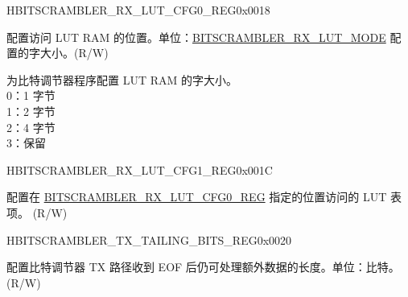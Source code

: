 \begin{register}{H}{BITSCRAMBLER\_RX\_LUT\_CFG0\_REG}{0x0018}\label{regdesc:BITSCRAMBLERRXLUTCFG0REG}
%
%
%
\regnewline%
\begin{regdesc}\begin{reglist}
\label{fielddesc:BITSCRAMBLERRXLUTIDX}\item [BITSCRAMBLER\_RX\_LUT\_IDX] 配置访问 LUT RAM 的位置。单位：\hyperref[fielddesc:BITSCRAMBLERRXLUTMODE]{BITSCRAMBLER\_RX\_LUT\_MODE} 配置的字大小。(R/W)
\label{fielddesc:BITSCRAMBLERRXLUTMODE}\item [BITSCRAMBLER\_RX\_LUT\_MODE] 为比特调节器程序配置 LUT RAM 的字大小。 \\
0：1 字节\\
1：2 字节\\
2：4 字节\\
3：保留 \\
\end{reglist}\end{regdesc}
\end{register}


\begin{register}{H}{BITSCRAMBLER\_RX\_LUT\_CFG1\_REG}{0x001C}\label{regdesc:BITSCRAMBLERRXLUTCFG1REG}
%
\regnewline%
\begin{regdesc}\begin{reglist}
\label{fielddesc:BITSCRAMBLERRXLUT}\item [BITSCRAMBLER\_RX\_LUT] 配置在  \hyperref[regdesc:BITSCRAMBLERRXLUTCFG0REG]{BITSCRAMBLER\_RX\_LUT\_CFG0\_REG} 指定的位置访问的 LUT 表项。 (R/W)
\end{reglist}\end{regdesc}
\end{register}


\begin{register}{H}{BITSCRAMBLER\_TX\_TAILING\_BITS\_REG}{0x0020}\label{regdesc:BITSCRAMBLERTXTAILINGBITSREG}
%
%
\regnewline%
\begin{regdesc}\begin{reglist}
\label{fielddesc:BITSCRAMBLERTXTAILINGBITS}\item [BITSCRAMBLER\_TX\_TAILING\_BITS] 配置比特调节器 TX 路径收到 EOF 后仍可处理额外数据的长度。单位：比特。 (R/W)
\end{reglist}\end{regdesc}
\end{register}



